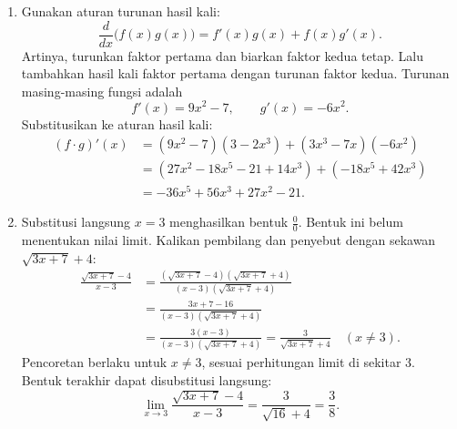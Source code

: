 \documentclass[10pt,letterpaper]{article}
\begin{document}
\begin{enumerate}
\begin{enumerate}
                Jika gradien garis singgung adalah $m_t$, maka
                \[
                  m_lm_t=-1\quad\Longrightarrow\quad
                  -\frac12m_t=-1\quad\Longrightarrow\quad m_t=2.
                \]
                Garis singgung melalui $(-2,1)$.
                Masukkan titik dan gradiennya ke bentuk $y-y_0=m(x-x_0)$:
                \begin{align*}
                  y-1 & =2\bigl(x-(-2)\bigr), \\
                  y-1 & =2x+4,                \\
                  y   & =2x+5.
                \end{align*}
                Jadi, persamaan garis singgungnya $\boxed{y=2x+5}$.
                Titik singgungnya memang berada pada lingkaran karena $(-2)^2+1^2=5$.
        \end{enumerate}

        \newpage

  \item Gunakan aturan turunan hasil kali:
        \[
          \boxed{\frac{d}{dx}\bigl(f(x)g(x)\bigr)=f'(x)g(x)+f(x)g'(x)}.
        \]
        Artinya, turunkan faktor pertama dan biarkan faktor kedua tetap.
        Lalu tambahkan hasil kali faktor pertama dengan turunan faktor kedua.
        Turunan masing-masing fungsi adalah
        \[
          f'(x)=9x^2-7,\qquad g'(x)=-6x^2.
        \]
        Substitusikan ke aturan hasil kali:
        \begin{align*}
          (f\cdot g)'(x)
           & =(9x^2-7)(3-2x^3)+(3x^3-7x)(-6x^2)     \\
           & =(27x^2-18x^5-21+14x^3)+(-18x^5+42x^3) \\
           & =\boxed{-36x^5+56x^3+27x^2-21}.
        \end{align*}

  \item Substitusi langsung $x=3$ menghasilkan bentuk $\frac00$.
        Bentuk ini belum menentukan nilai limit.
        Kalikan pembilang dan penyebut dengan sekawan $\sqrt{3x+7}+4$:
        \begin{align*}
          \frac{\sqrt{3x+7}-4}{x-3}
           & =\frac{(\sqrt{3x+7}-4)(\sqrt{3x+7}+4)}
              {(x-3)(\sqrt{3x+7}+4)} \\
           & =\frac{3x+7-16}{(x-3)(\sqrt{3x+7}+4)} \\
           & =\frac{3(x-3)}{(x-3)(\sqrt{3x+7}+4)}
          =\frac3{\sqrt{3x+7}+4}\quad(x\ne3).
        \end{align*}
        Pencoretan berlaku untuk $x\ne3$, sesuai perhitungan limit di sekitar $3$.
        Bentuk terakhir dapat disubstitusi langsung:
        \[
          \lim_{x\to3}\frac{\sqrt{3x+7}-4}{x-3}
          =\frac3{\sqrt{16}+4}=\boxed{\frac38}.
        \]


\end{enumerate}
\end{document}
